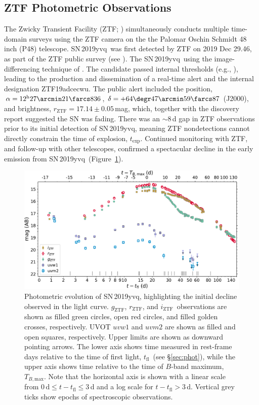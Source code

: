 \documentclass[twocolumn]{aastex63}
\newcommand{\rztf}{$r_\mathrm{ZTF}$}
\newcommand{\gztf}{$g_\mathrm{ZTF}$}
\newcommand{\iztf}{$i_\mathrm{ZTF}$}
\newcommand{\tfl}{$t_\mathrm{fl}$}
\newcommand{\tbmax}{$T_{B,\mathrm{max}}$}
\newcommand{\sn}{SN\,2019yvq}
\begin{document}
\subsection{ZTF Photometric Observations}



The Zwicky Transient Facility (ZTF; \citealt{Bellm19,Graham19,Dekany20})
simultaneously conducts multiple time-domain surveys using the ZTF camera on
the the Palomar Oschin Schmidt 48 inch (P48) telescope. \sn\ was first
detected by ZTF on 2019 Dec 29.46, as part of the ZTF public survey (see
\citealt{Bellm19a}). The  \sn\ using the image-differencing technique of \citet{Zackay16}. The
candidate passed internal thresholds (e.g., \citealt{Mahabal19}), leading to
the production and dissemination of a real-time alert \citep{Patterson19} and
the internal designation ZTF19adcecwu. The public alert included the position,
$\alpha = 12^{\mathrm{h}}27\arcmin21\farcs836$, $\delta =
+64\degr47\arcmin59\farcs87$ (J2000), and brightness, \rztf$ =
17.14\pm0.05$\,mag, which, together with the \citet{Itagaki19} discovery
report suggested the SN was fading. There was an $\sim$8\,d gap in ZTF
observations prior to its initial detection of \sn, meaning ZTF nondetections
cannot directly constrain the time of explosion, $t_\mathrm{exp}$. Continued
monitoring with ZTF, and follow-up with other telescopes, confirmed a
spectacular decline in the early emission from \sn\ (Figure~\ref{fig:p48}).

\begin{figure}
    \centering
    \includegraphics[width=6in]{./figures/P48_lc.pdf}
    \caption{Photometric evolution of \sn, highlighting the initial decline
    observed in the light curve. \gztf, \rztf, and \iztf\ observations are
    shown as filled green circles, open red circles, and filled golden
    crosses, respectively. UVOT $uvw1$ and $uvm2$
    are shown as filled and open squares, respectively. Upper limits are shown
    as downward pointing arrows. The lower axis shows time measured in
    rest-frame days relative to the time of first light, \tfl\ (see
    \S\ref{sec:phot}), while the upper axis shows time relative to the time of
    $B$-band maximum, \tbmax. Note that the horizontal axis is shown with a
    linear scale from $0\,\mathrm{d} \le t - t_\mathrm{fl} \le 3$\,d and a log
    scale for $t - t_\mathrm{fl} > 3$\,d. Vertical grey ticks show epochs of
    spectroscopic observations.}
    \label{fig:p48}
\end{figure}
\end{document}
